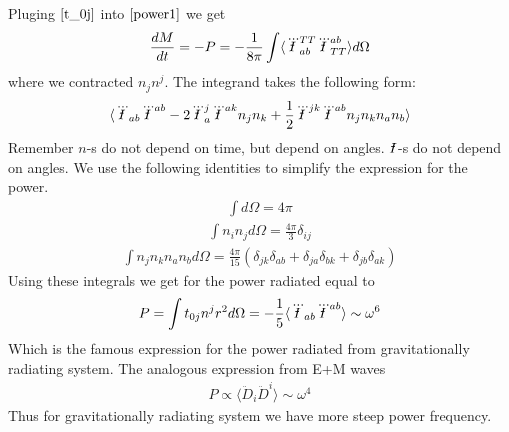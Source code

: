 \documentclass[11pt]{article}
\newcommand{\rqm}{{\declareslashed{}{\text{-}}{0.04}{0}{I}\slashed{I}}}
\begin{document}
Pluging $\ref{t_0j}$ into $\ref{power1}$ we get
\begin{align}
\frac{dM}{dt}= -P = - \frac{1}{8\pi}\int\langle \dddot{\rqm}^{TT}_{ab} \dddot{\rqm}^{ab}_{TT} \rangle d\Omega \label{power3}
\end{align}
where we contracted $n_j n^j$. The integrand takes the following form:
\begin{align}
\langle \dddot{\rqm}_{ab} \dddot{\rqm}^{ab} - 2\dddot{\rqm}_a^j \dddot{\rqm}^{ak}n_j n_k + \frac{1}{2}\dddot{\rqm}^{jk} \dddot{\rqm}^{ab} n_j n_k n_a n_b \rangle
\end{align}
Remember $n$-s do not depend on time, but depend on angles. $\rqm$-s do not depend on angles. We use the following identities to simplify the expression for the power.
\begin{align}
\int d\Omega = 4\pi
\end{align}
\begin{align}
\int n_i n_jd\Omega = \frac{4\pi}{3}\delta_{ij}
\end{align}
\begin{align}
\int n_j n_k n_a n_b d\Omega = \frac{4\pi}{15}(\delta_{jk}\delta_{ab}+\delta_{ja}\delta_{bk}+\delta_{jb}\delta_{ak})
\end{align}
Using these integrals we get for the power radiated equal to
\begin{align}
P = \int t_{0j}n^j r^2 d\Omega = - \frac{1}{5}\langle \dddot{\rqm}_{ab} \dddot{\rqm}^{ab} \rangle \sim \omega^6
\end{align}
Which is the famous expression for the power radiated from gravitationally radiating system. The analogous expression from E+M waves
\begin{align}
P \propto \langle \ddot{D}_i \ddot{D}^i \rangle \sim \omega^4
\end{align}
Thus for gravitationally radiating system we have more steep power frequency.
\end{document}
